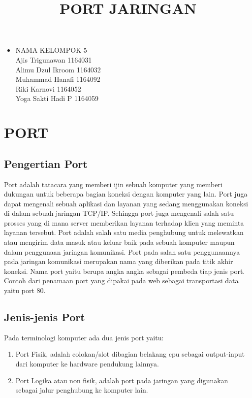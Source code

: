 \documentclass[12pt,a4paper]{article}
\begin{document}
\title{PORT JARINGAN}
\date{}
\maketitle

\begin{itemize}
\item
NAMA KELOMPOK 5\\
Ajis Trigunawan			1164031\\
Alimu Dzul Ikroom		1164032\\
Muhammad Hanafi			1164092\\
Riki Karnovi			1164052\\
Yoga Sakti Hadi P		1164059\\
\end{itemize}

\section{PORT}
\subsection{Pengertian Port}
\hspace{1cm}
Port adalah tatacara yang memberi ijin sebuah komputer yang memberi dukungan untuk beberapa bagian koneksi dengan komputer yang lain. Port juga dapat mengenali sebuah aplikasi dan layanan yang sedang menggunakan koneksi di dalam sebuah jaringan TCP/IP. Sehingga port juga mengenali salah satu prosses yang di mana server memberikan layanan terhadap klien yang meminta layanan tersebut. Port adalah salah satu media penghubung untuk melewatkan atau mengirim data masuk atau keluar baik pada sebuah komputer maupun dalam penggunaan jaringan komunikasi. Port pada salah satu penggunaannya pada jaringan komunikasi merupakan nama yang diberikan pada titik akhir koneksi. Nama port yaitu berupa angka angka sebagai pembeda tiap  jenis port. Contoh dari penamaan port yang dipakai pada web sebagai transportasi data yaitu port 80.


\subsection{Jenis-jenis Port}
\hspace{1cm}
Pada terminologi komputer ada dua jenis port yaitu:
\begin{enumerate}
\item Port Fisik, adalah colokan/slot dibagian belakang cpu sebagai output-input dari komputer ke hardware pendukung lainnya.
\item Port Logika atau non fisik, adalah port pada jaringan yang digunakan sebagai jalur penghubung ke komputer lain.
\end{enumerate}
\end{document}
